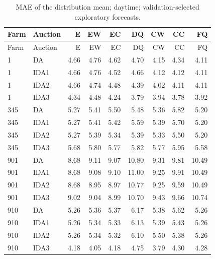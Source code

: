 \documentclass[11pt,a4paper]{article}
\begin{document}
\begin{longtable}{llrrrrrrr}
\caption{MAE of the distribution mean; daytime; validation-selected exploratory forecasts.}\\
\toprule Farm & Auction & E & EW & EC & DQ & CW & CC & FQ \\
\midrule\endfirsthead
\toprule Farm & Auction & E & EW & EC & DQ & CW & CC & FQ \\
\midrule\endhead
1 & DA & 4.66 & 4.76 & 4.62 & 4.70 & 4.15 & 4.34 & 4.11 \\
1 & IDA1 & 4.66 & 4.76 & 4.52 & 4.66 & 4.12 & 4.12 & 4.11 \\
1 & IDA2 & 4.66 & 4.74 & 4.48 & 4.39 & 4.02 & 4.11 & 4.11 \\
1 & IDA3 & 4.34 & 4.48 & 4.24 & 3.79 & 3.94 & 3.78 & 3.92 \\
\midrule
345 & DA & 5.27 & 5.41 & 5.50 & 5.48 & 5.36 & 5.82 & 5.20 \\
345 & IDA1 & 5.27 & 5.41 & 5.42 & 5.59 & 5.39 & 5.70 & 5.20 \\
345 & IDA2 & 5.27 & 5.39 & 5.34 & 5.39 & 5.33 & 5.50 & 5.20 \\
345 & IDA3 & 5.68 & 5.80 & 5.77 & 5.82 & 5.77 & 5.95 & 5.58 \\
\midrule
901 & DA & 8.68 & 9.11 & 9.07 & 10.80 & 9.31 & 9.81 & 10.49 \\
901 & IDA1 & 8.68 & 9.08 & 9.10 & 11.00 & 9.25 & 9.91 & 10.49 \\
901 & IDA2 & 8.68 & 8.95 & 8.97 & 10.77 & 9.25 & 9.59 & 10.49 \\
901 & IDA3 & 9.02 & 9.04 & 8.99 & 10.70 & 9.43 & 9.66 & 10.74 \\
\midrule
910 & DA & 5.26 & 5.36 & 5.37 & 6.17 & 5.38 & 5.62 & 5.26 \\
910 & IDA1 & 5.26 & 5.34 & 5.33 & 6.13 & 5.39 & 5.43 & 5.26 \\
910 & IDA2 & 5.26 & 5.34 & 5.32 & 6.10 & 5.50 & 5.38 & 5.26 \\
910 & IDA3 & 4.18 & 4.05 & 4.18 & 4.75 & 3.79 & 4.30 & 4.28 \\
\midrule
\bottomrule\end{longtable}
\normalsize
\small
\end{document}

